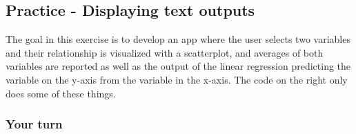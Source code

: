 \documentclass[
  letterpaper,
  DIV=11,
  numbers=noendperiod]{scrreprt}
\newenvironment{Shaded}{\begin{snugshade}}{\end{snugshade}}
\newcommand{\AttributeTok}[1]{\textcolor[rgb]{0.40,0.46,0.14}{#1}}
\newcommand{\CommentTok}[1]{\textcolor[rgb]{0.37,0.37,0.37}{#1}}
\newcommand{\ControlFlowTok}[1]{\textcolor[rgb]{0.00,0.46,0.62}{#1}}
\newcommand{\FunctionTok}[1]{\textcolor[rgb]{0.28,0.35,0.67}{#1}}
\newcommand{\NormalTok}[1]{\textcolor[rgb]{0.00,0.46,0.62}{#1}}
\newcommand{\OtherTok}[1]{\textcolor[rgb]{0.00,0.46,0.62}{#1}}
\newcommand{\SpecialCharTok}[1]{\textcolor[rgb]{0.37,0.37,0.37}{#1}}
\begin{document}
\begin{Shaded}
\end{Shaded}

\hypertarget{practice---displaying-text-outputs}{%
\subsection{Practice - Displaying text
outputs}\label{practice---displaying-text-outputs}}

The goal in this exercise is to develop an app where the user selects
two variables and their relationship is visualized with a scatterplot,
and averages of both variables are reported as well as the output of the
linear regression predicting the variable on the y-axis from the
variable in the x-axis. The code on the right only does some of these
things.

\hypertarget{your-turn-17}{%
\subsubsection{Your turn}\label{your-turn-17}}
\end{document}
